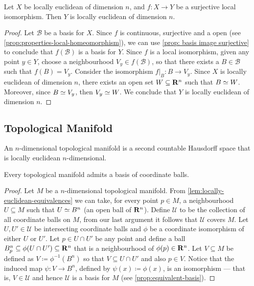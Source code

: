 \begin{proposition}
    \label{prop:locally-euclidean-from-surjective-map}
    Let \(X\) be locally euclidean of dimension \(n\), and \(f: X \to Y\) be a
    surjective local isomorphism. Then \(Y\) is locally euclidean of dimension
    \(n\).
\end{proposition}

\begin{proof}
    Let \(\mathcal B\) be a basis for \(X\). Since \(f\) is continuous, surjective
    and a open (see \cref{prop:properties-local-homeomorphism}), we can use
    \cref{prop: basis image surjective} to conclude that \(f(\mathcal B)\) is a
    basis for \(Y\). Since \(f\) is a local isomorphism, given any point \(y \in
    Y\), choose a neighbourhood \(V_y \in f(\mathcal B)\), so that there exists a
    \(B \in \mathcal B\) such that \(f(B) = V_y\). Consider the isomorphism
    \(f|_B: B \to V_y\). Since \(X\) is locally euclidean of dimension \(n\), there
    exists an open set \(W \subseteq \mathbf{R}^n\) such that \(B \simeq W\). Moreover, since
    \(B \simeq V_y\), then \(V_y \simeq W\). We conclude that \(Y\) is locally euclidean
    of dimension \(n\).
\end{proof}

\subsection{Topological Manifold}

\begin{definition}\label{def: topological manifold}
    An \(n\)-dimensional topological manifold is a second countable Hausdorff
    space that is locally euclidean \(n\)-dimensional.
\end{definition}

\begin{proposition}\label{prop:coordinate-ball-basis}
    Every topological manifold admits a basis of coordinate balls.
\end{proposition}

\begin{proof}
    Let \(M\) be a \(n\)-dimensional topological manifold. From
    \cref{lem:locally-euclidean-equivalences} we can take, for every point \(p \in
    M\), a neighbourhood \(U \subseteq M\) such that \(U \simeq B^n\) (an open ball of
    \(\mathbf{R}^n\)). Define \(\mathcal{U}\) to be the collection of all coordinate balls
    on \(M\), from our last argument it follows that \(\mathcal U\) covers
    \(M\). Let \(U, U' \in \mathcal U\) be intersecting coordinate balls and
    \(\phi\) be a coordinate isomorphism of either \(U\) or \(U'\). Let \(p \in U
    \cap U'\) be any point and define a ball \(B_{p}^{n} \subseteq \phi(U
    \cap U') \subseteq \mathbf{R}^n\) that is a neighbourhood of \(\phi(p) \in \mathbf{R}^n\).
    Let \(V \subseteq M\) be defined as \(V \coloneq \phi^{-1}(B^n)\) so that \(V
    \subseteq U \cap U'\) and also \(p \in V\). Notice that the induced map \(\psi:
    V \to B^n\), defined by \(\psi(x) \coloneq \phi(x)\), is an isomorphism --- that
    is, \(V \in \mathcal U\) and hence \(\mathcal U\) is a basis for \(M\) (see
    \cref{prop:equivalent-basis}).
\end{proof}

